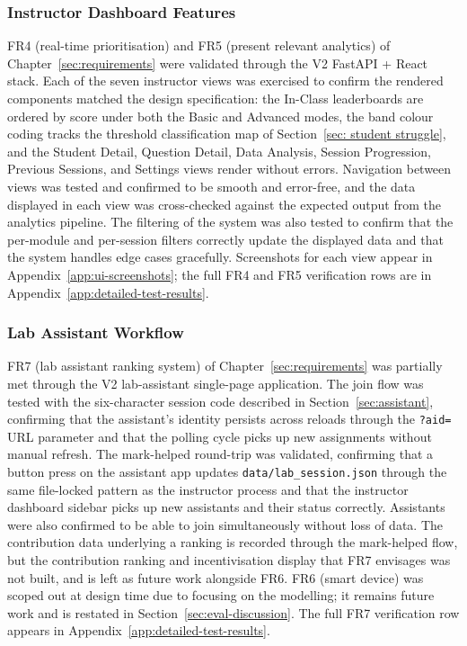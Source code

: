 \subsubsection{Instructor Dashboard Features} \label{sec:eval-instructor-features}
FR4 (real-time prioritisation) and FR5 (present relevant analytics) of Chapter~\ref{sec:requirements} were validated through the V2 FastAPI + React stack.
Each of the seven instructor views was exercised to confirm the rendered components matched the design specification: the In-Class leaderboards are ordered by score under both the Basic and Advanced modes, the band colour coding tracks the threshold classification map of Section~\ref{sec: student struggle}, and the Student Detail, Question Detail, Data Analysis, Session Progression, Previous Sessions, and Settings views render without errors.
Navigation between views was tested and confirmed to be smooth and error-free, and the data displayed in each view was cross-checked against the expected output from the analytics pipeline.
The filtering of the system was also tested to confirm that the per-module and per-session filters correctly update the displayed data and that the system handles edge cases gracefully.
Screenshots for each view appear in Appendix~\ref{app:ui-screenshots}; the full FR4 and FR5 verification rows are in Appendix~\ref{app:detailed-test-results}.

\subsubsection{Lab Assistant Workflow} \label{sec:eval-assistant-workflow}
FR7 (lab assistant ranking system) of Chapter~\ref{sec:requirements} was partially met through the V2 lab-assistant single-page application.
The join flow was tested with the six-character session code described in Section~\ref{sec:assistant}, confirming that the assistant's identity persists across reloads through the \texttt{?aid=} URL parameter and that the polling cycle picks up new assignments without manual refresh.
The mark-helped round-trip was validated, confirming that a button press on the assistant app updates \texttt{data/lab\_session.json} through the same file-locked pattern as the instructor process and that the instructor dashboard sidebar picks up new assistants and their status correctly.
Assistants were also confirmed to be able to join simultaneously without loss of data.
The contribution data underlying a ranking is recorded through the mark-helped flow, but the contribution ranking and incentivisation display that FR7 envisages was not built, and is left as future work alongside FR6.
FR6 (smart device) was scoped out at design time due to focusing on the modelling; it remains future work and is restated in Section~\ref{sec:eval-discussion}. The full FR7 verification row appears in Appendix~\ref{app:detailed-test-results}.



